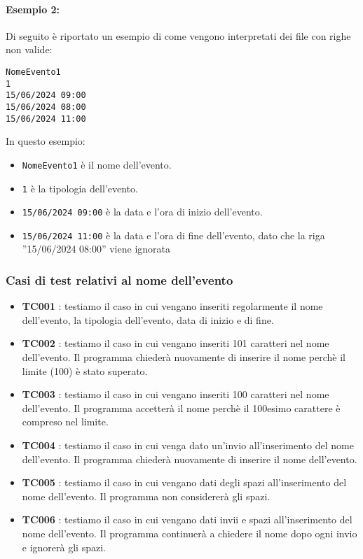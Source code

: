 \documentclass[11pt]{scrartcl} %
\begin{document}
\paragraph{Esempio 2:}

Di seguito è riportato un esempio di come vengono interpretati dei file con righe non valide:

\begin{lstlisting}
NomeEvento1
1
15/06/2024 09:00
15/06/2024 08:00
15/06/2024 11:00
\end{lstlisting}

In questo esempio:
\begin{itemize}
    \item \texttt{NomeEvento1} è il nome dell'evento.
    \item \texttt{1} è la tipologia dell'evento.
    \item \texttt{15/06/2024 09:00} è la data e l'ora di inizio dell'evento.
    \item \texttt{15/06/2024 11:00} è la data e l'ora di fine dell'evento, dato che la riga ''15/06/2024 08:00'' viene ignorata
\end{itemize}


\subsubsection{Casi di test relativi al nome dell'evento}

\begin{itemize}
	\item \textbf{TC001} : testiamo il caso in cui vengano inseriti regolarmente il nome dell’evento, la tipologia dell’evento, data di inizio e di fine.

	\item \textbf{TC002} : testiamo il caso in cui vengano inseriti 101 caratteri nel nome dell’evento. Il programma chiederà nuovamente di inserire il nome perchè il limite (100) è stato superato.

	\item \textbf{TC003} : testiamo il caso in cui vengano inseriti 100 caratteri nel nome dell’evento. Il programma accetterà il nome perchè il 100esimo carattere è compreso nel limite.

	\item \textbf{TC004} : testiamo il caso in cui venga dato un’invio all’inserimento del nome dell’evento. Il programma chiederà nuovamente di inserire il nome dell’evento.

	\item \textbf{TC005} : testiamo il caso in cui vengano dati degli spazi all’inserimento del nome dell’evento. Il programma non considererà gli spazi.

	\item \textbf{TC006} : testiamo il caso in cui vengano dati invii e spazi all’inserimento del nome dell’evento. Il programma continuerà a chiedere il nome dopo ogni invio e ignorerà gli spazi.

\end{itemize}
\end{document}
